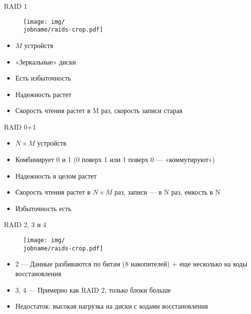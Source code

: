 \documentclass[xetex,aspectratio=43]{beamer}
\begin{document}
\begin{frame}{RAID 1}
    \begin{figure}
        \texttt{[image: img/\\jobname/raids-crop.pdf]}
    \end{figure}

\begin{itemize}
\tightlist
\item
  \(M\) устройств
\item
  «Зеркальные» диски
\item
  Есть избыточность
\item
  Надежность растет
\item
  Скорость чтения растет в M раз, скорость записи старая
\end{itemize}
\end{frame}

\begin{frame}
\begin{block}{RAID 0+1}
\begin{itemize}
\tightlist
\item
  \(N\times M\) устройств
\item
  Комбинирует 0 и 1 (0 поверх 1 или 1 поверх 0 --- «коммутируют»)
\item
  Надежность в целом растет
\item
  Скорость чтения растет в \(N\times M\) раз, записи --- в N раз,
  емкость в N
\item
  Избыточность есть
\end{itemize}
\end{block}
\end{frame}

\begin{frame}{RAID 2, 3 и 4}
    \begin{figure}
        \texttt{[image: img/\\jobname/raids-crop.pdf]}
    \end{figure}

\begin{itemize}
\tightlist
\item
  2 --- Данные разбиваются по битам (8 накопителей) + еще несколько на
  коды восстановления
\item
  3, 4 --- Примерно как RAID 2, только блоки больше
\item
  Недостаток: высокая нагрузка на диски с кодами восстановления
\end{itemize}
\end{frame}
\end{document}
